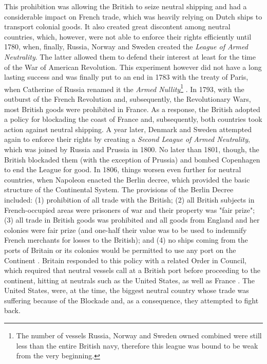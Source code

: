 \documentclass[12pt,a4paper,notitlepage,english]{article}
\begin{document}
This prohibition was allowing the British to seize neutral shipping and had a considerable impact on French trade, which was heavily relying on Dutch ships to transport colonial goods.
It also created great discontent among neutral countries, which, however, were not able to enforce their rights efficiently until 1780, when, finally, Russia, Norway and Sweden created the \textit{League of Armed Neutrality}.
The latter allowed them to defend their interest at least for the time of the War of American Revolution.
This experiment however did not have a long lasting success and was finally put to an end in 1783 with the treaty of Paris, when Catherine of Russia renamed it the \textit{Armed Nullity}\footnote{The number of vessels Russia, Norway and Sweden owned combined were still less than the entire British navy, therefore this league was bound to be weak from the very beginning.} \citep{griffiths1971american}.
In 1793, with the outburst of the French Revolution and, subsequently, the Revolutionary Wars, most British goods were prohibited in France.
As a response, the British adopted a policy for blockading the coast of France and, subsequently, both countries took action against neutral shipping.
A year later, Denmark and Sweden attempted again to enforce their rights by creating a \textit{Second League of Armed Neutrality}, which was joined by Russia and Prussia in 1800.
No later than 1801, though, the British blockaded them (with the exception of Prussia) and bombed Copenhagen to end the League for good.
In 1806, things worsen even further for neutral countries, when Napoleon enacted the Berlin decree, which provided the basic structure of the Continental System.
The provisions of the Berlin Decree included: (1) prohibition of all trade with the British; (2) all British subjects in French-occupied areas were prisoners of war and their property was "fair prize"; (3) all trade in British goods was prohibited and all goods from England and her colonies were fair prize (and one-half their value was to be used to indemnify French merchants for losses to the British); and (4) no ships coming from the ports of Britain or its colonies would be permitted to use any port on the Continent \citep{davis2006naval}.
Britain responded to this policy with a related Order in Council, which required that neutral vessels call at a British port before proceeding to the continent, hitting at neutrals such as the United States, as well as France \citep{davis2006naval}.
The United States, were, at the time, the biggest neutral country whose trade was suffering because of the Blockade and, as a consequence, they attempted to fight back.
\end{document}
